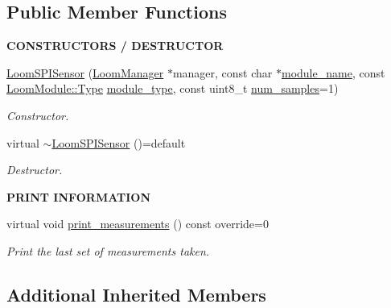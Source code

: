 \subsection*{Public Member Functions}
\begin{Indent}{\bf C\+O\+N\+S\+T\+R\+U\+C\+T\+O\+RS / D\+E\+S\+T\+R\+U\+C\+T\+OR}\par
\begin{DoxyCompactItemize}
\item 
\hyperlink{class_loom_s_p_i_sensor_ad233b49ab4866eb00a5be927adb35f99}{Loom\+S\+P\+I\+Sensor} (\hyperlink{class_loom_manager}{Loom\+Manager} $\ast$manager, const char $\ast$\hyperlink{class_loom_module_adf6e68ad7e9fa2acfca7a8a280680764}{module\+\_\+name}, const \hyperlink{class_loom_module_aee91d0a75140d51ee428fc2d4417d865}{Loom\+Module\+::\+Type} \hyperlink{class_loom_module_a152d394f37236a2b159dae19da67eeb0}{module\+\_\+type}, const uint8\+\_\+t \hyperlink{class_loom_sensor_a0e74ebbaecde15ed1c71e1bb6bc6aebe}{num\+\_\+samples}=1)
\begin{DoxyCompactList}\small\item\em Constructor. \end{DoxyCompactList}\item 
virtual \hyperlink{class_loom_s_p_i_sensor_ad0b8685af623711042caf9014c2e2863}{$\sim$\+Loom\+S\+P\+I\+Sensor} ()=default
\begin{DoxyCompactList}\small\item\em Destructor. \end{DoxyCompactList}\end{DoxyCompactItemize}
\end{Indent}
\begin{Indent}{\bf P\+R\+I\+NT I\+N\+F\+O\+R\+M\+A\+T\+I\+ON}\par
\begin{DoxyCompactItemize}
\item 
virtual void \hyperlink{class_loom_s_p_i_sensor_a9aa10745cef677aad99020c46d3e1ed6}{print\+\_\+measurements} () const override=0
\begin{DoxyCompactList}\small\item\em Print the last set of measurements taken. \end{DoxyCompactList}\end{DoxyCompactItemize}
\end{Indent}
\subsection*{Additional Inherited Members}


